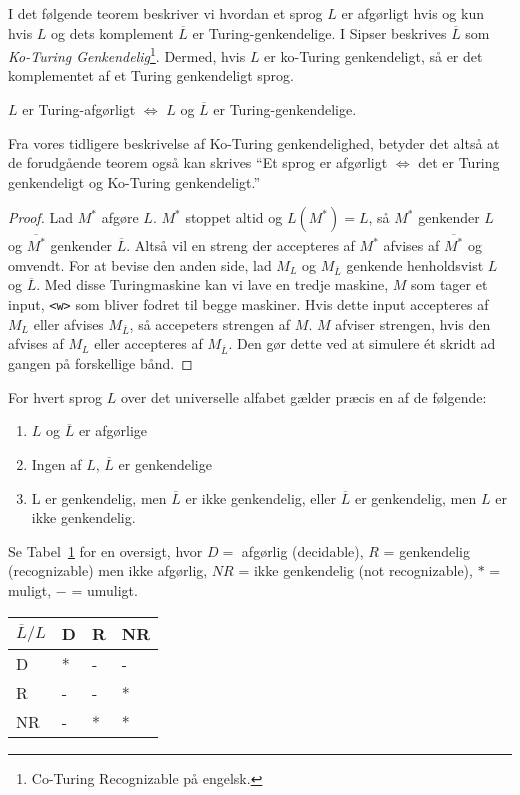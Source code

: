 I det følgende teorem beskriver vi hvordan et sprog $L$ er afgørligt hvis og kun hvis $L$ og dets komplement $\overline{L}$ er Turing-genkendelige. I Sipser beskrives $\overline{L}$ som \textit{Ko-Turing Genkendelig}\footnote{Co-Turing Recognizable på engelsk.}. Dermed, hvis $L$ er ko-Turing genkendeligt, så er det komplementet af et Turing genkendeligt sprog.

\begin{theorem}
  \label{teo:decideablecoturing}
	$L$ er Turing-afgørligt $\iff$ $L$ og $\overline{L}$ er Turing-genkendelige.
\end{theorem}

Fra vores tidligere beskrivelse af Ko-Turing genkendelighed, betyder det altså at de forudgående teorem også kan skrives ``Et sprog er afgørligt $\iff$ det er Turing genkendeligt og Ko-Turing  genkendeligt.''

\begin{proof}
	Lad $M^{*}$ afgøre $L$. $M^{*}$ stoppet altid og $L(M^{*}) = L$, så $M^{*}$ genkender $L$ og $\overline{M^{*}}$ genkender $\overline{L}$. Altså vil en streng der accepteres af $M^{*}$ afvises af $\overline{M^{*}}$ og omvendt. For at bevise den anden side, lad $M_{L}$ og $M_{\overline{L}}$ genkende henholdsvist $L$ og $\overline{L}$. Med disse Turingmaskine kan vi lave en tredje maskine, $M$ som tager et input, \texttt{<w>} som bliver fodret til begge maskiner. Hvis dette input accepteres af $M_{L}$ eller afvises $M_{\overline{L}}$, så accepeters strengen af $M$. $M$ afviser strengen, hvis den afvises af $M_{L}$ eller accepteres af $M_{\overline{L}}$. Den gør dette ved at simulere ét skridt ad gangen på forskellige bånd.
\end{proof}

\begin{theorem}
	For hvert sprog $L$ over det universelle alfabet gælder præcis en af de følgende:
	\begin{enumerate}
		\item $L$ og $\overline{L}$ er afgørlige
		\item Ingen af $L$, $\overline{L}$ er genkendelige
		\item L er genkendelig, men $\overline{L}$ er ikke genkendelig, eller $\overline{L}$ er genkendelig, men $L$ er ikke genkendelig.
	\end{enumerate}
	Se Tabel~\ref{table:afgørliggenkendelig} for en oversigt, hvor $D = $ afgørlig (decidable), $R$ = genkendelig (recognizable) men ikke afgørlig, $NR$ = ikke genkendelig (not recognizable), $*$ = muligt, $-$ = umuligt.
\end{theorem}
	\begin{table}[ht]
		\centering
		\begin{tabular}{|l|l|l|l|}
			\hline
			$\overline{L} / L$ & D & R & NR \\ \hline
			D                  & * & - & -  \\ \hline
			R                  & - & - & *  \\ \hline
			NR                 & - & * & *  \\ \hline
		\end{tabular}
		\label{table:afgørliggenkendelig}
	\end{table}

